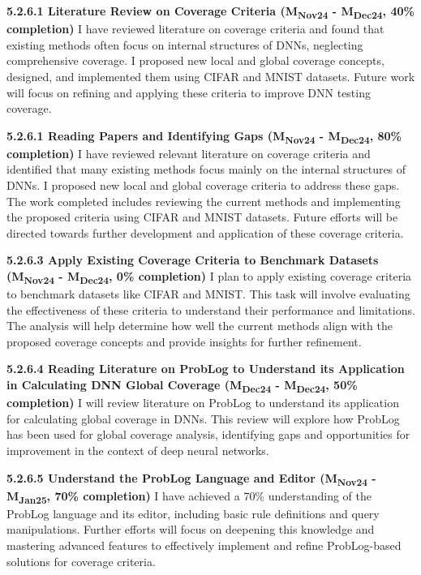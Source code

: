 \noindent \textbf{5.2.6.1 Literature Review on Coverage Criteria (M\textsubscript{Nov24} - M\textsubscript{Dec24}, 40\% completion)} I have reviewed literature on coverage criteria and found that existing methods often focus on internal structures of DNNs, neglecting comprehensive coverage. I proposed new local and global coverage concepts, designed, and implemented them using CIFAR and MNIST datasets. Future work will focus on refining and applying these criteria to improve DNN testing coverage.



\noindent \textbf{5.2.6.1 Reading Papers and Identifying Gaps (M\textsubscript{Nov24} - M\textsubscript{Dec24}, 80\% completion)} I have reviewed relevant literature on coverage criteria and identified that many existing methods focus mainly on the internal structures of DNNs. I proposed new local and global coverage criteria to address these gaps. The work completed includes reviewing the current methods and implementing the proposed criteria using CIFAR and MNIST datasets. Future efforts will be directed towards further development and application of these coverage criteria.


\noindent \textbf{5.2.6.3 Apply Existing Coverage Criteria to Benchmark Datasets (M\textsubscript{Nov24} - M\textsubscript{Dec24}, 0\% completion)} I plan to apply existing coverage criteria to benchmark datasets like CIFAR and MNIST. This task will involve evaluating the effectiveness of these criteria to understand their performance and limitations. The analysis will help determine how well the current methods align with the proposed coverage concepts and provide insights for further refinement.

\noindent \textbf{5.2.6.4 Reading Literature on ProbLog to Understand its Application in Calculating DNN Global Coverage (M\textsubscript{Dec24} - M\textsubscript{Dec24}, 50\% completion)} I will review literature on ProbLog to understand its application for calculating global coverage in DNNs. This review will explore how ProbLog has been used for global coverage analysis, identifying gaps and opportunities for improvement in the context of deep neural networks.


\noindent \textbf{5.2.6.5 Understand the ProbLog Language and Editor (M\textsubscript{Nov24} - M\textsubscript{Jan25}, 70\% completion)} I have achieved a 70\% understanding of the ProbLog language and its editor, including basic rule definitions and query manipulations. Further efforts will focus on deepening this knowledge and mastering advanced features to effectively implement and refine ProbLog-based solutions for coverage criteria.


